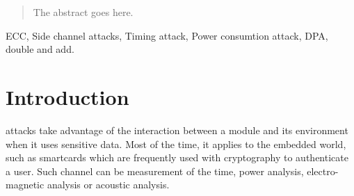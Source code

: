 \documentclass[journal]{IEEEtran}
\begin{document}







\maketitle


\begin{abstract}
The abstract goes here.
\end{abstract}

\begin{IEEEkeywords}
ECC, Side channel attacks, Timing attack, Power consumtion attack, DPA, double and add.
\end{IEEEkeywords}






%
\IEEEpeerreviewmaketitle



\section{Introduction}

 attacks take advantage of the interaction between a module and its environment when it uses sensitive data. Most of the time, it applies to the embedded world, such as smartcards which are frequently used with cryptography to authenticate a user. Such channel can be measurement of the time, power analysis, electro-magnetic analysis or acoustic analysis.\\
\end{document}
